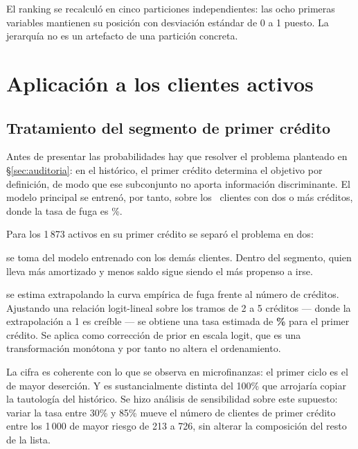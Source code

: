 \documentclass[11pt,a4paper]{article}
\begin{document}
El ranking se recalculó en cinco particiones independientes: las ocho primeras
variables mantienen su posición con desviación estándar de 0 a 1 puesto. La
jerarquía no es un artefacto de una partición concreta.

\section{Aplicación a los clientes activos}

\subsection{Tratamiento del segmento de primer crédito}
\label{sec:primercredito}

Antes de presentar las probabilidades hay que resolver el problema planteado en
\S\ref{sec:auditoria}: en el histórico, el primer crédito determina el objetivo
por definición, de modo que ese subconjunto no aporta información discriminante.
El modelo principal se entrenó, por tanto, sobre los \NModelable\ clientes con
dos o más créditos, donde la tasa de fuga es \PrevalenciaKdos\%.

Para los 1\,873 activos en su primer crédito se separó el problema en dos:

\begin{description}[leftmargin=1.4em,style=nextline,nosep]
\item[El ordenamiento] se toma del modelo entrenado con los demás clientes. Dentro
      del segmento, quien lleva más amortizado y menos saldo sigue siendo el más
      propenso a irse.
\item[El nivel] se estima extrapolando la curva empírica de fuga frente al número
      de créditos. Ajustando una relación logit-lineal sobre los tramos de 2 a 5
      créditos --- donde la extrapolación a 1 es creíble --- se obtiene una tasa
      estimada de \textbf{\TasaKuno\%} para el primer crédito. Se aplica como
      corrección de prior en escala logit, que es una transformación monótona y
      por tanto no altera el ordenamiento.
\end{description}

\noindent La cifra es coherente con lo que se observa en microfinanzas: el primer
ciclo es el de mayor deserción. Y es sustancialmente distinta del 100\% que
arrojaría copiar la tautología del histórico. Se hizo análisis de sensibilidad
sobre este supuesto: variar la tasa entre 30\% y 85\% mueve el número de clientes
de primer crédito entre los 1\,000 de mayor riesgo de 213 a 726, sin alterar la
composición del resto de la lista.
\end{document}
